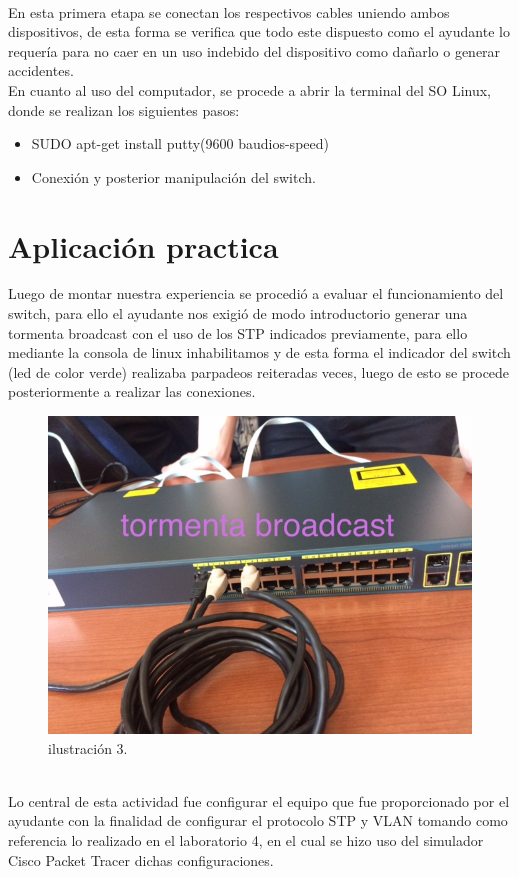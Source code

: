 \documentclass[spanish]{udpreport}
\begin{document}
\\[0.2cm]
En esta primera etapa se conectan los respectivos cables uniendo ambos dispositivos, de esta forma se verifica que todo este dispuesto como el ayudante lo requería para no caer en un uso indebido del dispositivo como dañarlo o generar accidentes.
\\[0.2cm]
En cuanto al uso del computador, se procede a abrir la terminal del SO Linux, donde se  realizan los siguientes pasos:
\\
\begin{itemize}
    \item SUDO apt-get install putty(9600 baudios-speed)
    \item Conexión y posterior manipulación del switch.
\end{itemize}

\newpage
\section{Aplicación practica}
Luego de montar nuestra experiencia se procedió a evaluar el funcionamiento del switch, para ello el ayudante nos exigió de modo introductorio generar una tormenta broadcast con el uso de los STP indicados previamente, para ello mediante la consola de linux inhabilitamos y de esta forma el indicador del switch (led de color verde) realizaba parpadeos reiteradas veces, luego de esto se procede posteriormente a realizar las conexiones.
\\[0.2cm]
\begin{figure}[h]
    \centering
    \includegraphics[scale=0.5]{images/a3a3a3.png}
    \caption{ilustración 3.}
    \label{fig:my_label}
\end{figure}
\\[0.2cm]
Lo central de esta actividad fue configurar el equipo que fue proporcionado por el ayudante con la finalidad de configurar el protocolo STP y VLAN tomando como referencia lo realizado en el laboratorio 4, en el cual se hizo uso del simulador Cisco Packet Tracer dichas configuraciones.
\newpage
\end{document}
